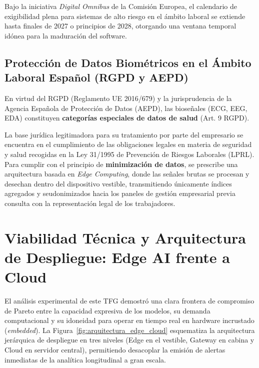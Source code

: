 Bajo la iniciativa \textit{Digital Omnibus} de la Comisión Europea, el calendario de exigibilidad plena para sistemas de alto riesgo en el ámbito laboral se extiende hasta finales de 2027 o principios de 2028, otorgando una ventana temporal idónea para la maduración del software.

\subsection{Protección de Datos Biométricos en el Ámbito Laboral Español (RGPD y AEPD)}

En virtud del RGPD (Reglamento UE 2016/679) y la jurisprudencia de la Agencia Española de Protección de Datos (AEPD), las bioseñales (ECG, EEG, EDA) constituyen \textbf{categorías especiales de datos de salud} (Art. 9 RGPD).

La base jurídica legitimadora para su tratamiento por parte del empresario se encuentra en el cumplimiento de las obligaciones legales en materia de seguridad y salud recogidas en la Ley 31/1995 de Prevención de Riesgos Laborales (LPRL). Para cumplir con el principio de \textbf{minimización de datos}, se prescribe una arquitectura basada en \textit{Edge Computing}, donde las señales brutas se procesan y desechan dentro del dispositivo vestible, transmitiendo únicamente índices agregados y seudonimizados hacia los paneles de gestión empresarial previa consulta con la representación legal de los trabajadores.



\clearpage
\section{Viabilidad Técnica y Arquitectura de Despliegue: Edge AI frente a Cloud}
\label{sec:val_arquitectura_edge}

El análisis experimental de este TFG demostró una clara frontera de compromiso de Pareto entre la capacidad expresiva de los modelos, su demanda computacional y su idoneidad para operar en tiempo real en hardware incrustado (\textit{embedded}). La Figura~\ref{fig:arquitectura_edge_cloud} esquematiza la arquitectura jerárquica de despliegue en tres niveles (Edge en el vestible, Gateway en cabina y Cloud en servidor central), permitiendo desacoplar la emisión de alertas inmediatas de la analítica longitudinal a gran escala.

